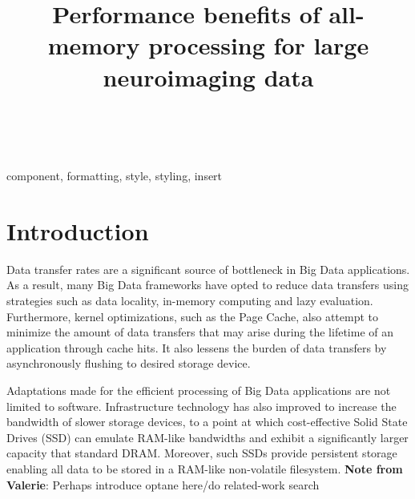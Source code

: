 \documentclass[conference]{IEEEtran}
\newcommand{\bigdata}{Big Data }
\newcommand{\valerie}[1]{\color{blue}\textbf{Note from Valerie}:
      #1 \color{black}}
\begin{document}
\title{Performance benefits of all-memory processing for large neuroimaging data}

\author{\\
}
\maketitle

\begin{abstract}
\end{abstract}

\begin{IEEEkeywords}
component, formatting, style, styling, insert
\end{IEEEkeywords}

\section{Introduction}
Data transfer rates are a significant source of bottleneck in \bigdata
applications. As a result, many \bigdata frameworks have opted to reduce data
transfers using strategies such as data locality, in-memory computing and lazy
evaluation. Furthermore, kernel optimizations, such as the Page Cache, also
attempt to minimize the amount of data transfers that may arise during the
lifetime of an application through cache hits. It also lessens the burden of
data transfers by asynchronously flushing to desired storage device.

Adaptations made for the efficient processing of \bigdata applications are not 
limited to software. Infrastructure technology has also improved to increase the
bandwidth of slower storage devices, to a point at which cost-effective Solid 
State Drives (SSD) can emulate RAM-like bandwidths and exhibit a significantly 
larger capacity that standard DRAM. Moreover, such SSDs provide persistent
storage enabling all data to be stored in a RAM-like non-volatile filesystem.
\valerie{Perhaps introduce optane here/do related-work search}
\end{document}
